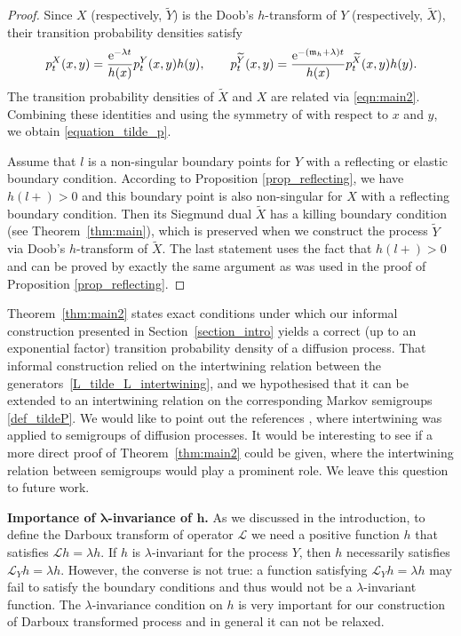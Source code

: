 \documentclass[pdftex]{sigma}
\numberwithin{equation}{section}
\theoremstyle{definition}
\def\L{{\mathcal L}}
\begin{document}
\begin{proof}
Since $X$ \big(respectively, $\widetilde Y$\big) is the Doob's $h$-transform of $Y$ \big(respectively, $\widetilde X$\big), their transition probability densities satisfy
\begin{align*}
 p^X_t(x,y)=\frac{{\rm e}^{-\lambda t}}{h(x)}p_t^Y(x,y) h(y), \qquad
 p^{\widetilde Y}_t(x,y)=\frac{{\rm e}^{-({\mathfrak m}_h + \lambda) t}}{h(x)}p_t^{\widetilde X}(x,y) h(y).
\end{align*}
The transition probability densities of $\widetilde X$ and $X$ are related via \eqref{eqn:main2}. Combining these identities and using the symmetry of  with respect to $x$ and $y$, we obtain \eqref{equation_tilde_p}.

Assume that $l$ is a non-singular boundary points for $Y$ with a reflecting or elastic boundary condition. According to Proposition
\ref{prop_reflecting}, we have $h(l+)>0$ and this boundary point is also non-singular for $X$ with a reflecting boundary condition. Then its Siegmund dual $\widetilde X$ has a killing boundary condition (see Theorem~\ref{thm:main}), which is preserved when we construct the process $\widetilde Y$ via Doob's $h$-transform of $\widetilde X$. The last statement uses the fact that $h(l+)>0$ and can be proved by exactly the same argument as was used in the proof of Proposition \ref{prop_reflecting}.
\end{proof}

Theorem~\ref{thm:main2} states exact conditions under which our informal construction presented in Section~\ref{section_intro} yields a correct (up to an exponential factor) transition probability density of a diffusion process. That informal construction relied on the intertwining relation between the generators~\eqref{L_tilde_L_intertwining}, and we hypothesised that it can be extended to an intertwining relation on the corresponding Markov semigroups \eqref{def_tildeP}. We would like to point out the references
\cite{Bonnefont_2014,Fill_2016,Patie_2019}, where intertwining was applied to semigroups of diffusion processes. It would be interesting to see if a more direct proof of Theorem~\ref{thm:main2} could be given, where the intertwining relation between semigroups would play a prominent role. We leave this question to future work.


{\bf Importance of $\boldsymbol{\lambda}$-invariance of $\boldsymbol{h}$.}
 As we discussed in the introduction, to define the Darboux transform of operator $\L$ we need a positive function $h$ that satisfies $\L h=\lambda h$. If $h$ is $\lambda$-invariant for the process $Y$, then $h$ necessarily satisfies $\L_Y h=\lambda h$. However, the converse is not true: a function satisfying $\L_Y h=\lambda h$ may fail to satisfy the boundary conditions and thus would not be a $\lambda$-invariant function. The $\lambda$-invariance condition on $h$ is very important for our construction of Darboux transformed process and in general it can not be relaxed.
\end{document}
